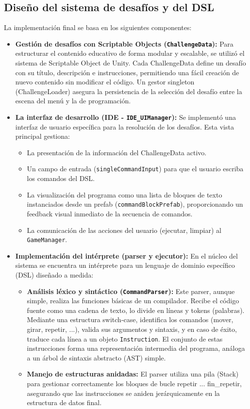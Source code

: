 \subsection{Diseño del sistema de desafíos y del DSL}
La implementación final se basa en los siguientes componentes:
\begin{itemize}
	\item \textbf{Gestión de desafíos con Scriptable Objects (\texttt{ChallengeData}):} Para estructurar el contenido educativo de forma modular y escalable, se utilizó el sistema de Scriptable Object de Unity. Cada ChallengeData define un desafío con su título, descripción e instrucciones, permitiendo una fácil creación de nuevo contenido sin modificar el código. Un gestor singleton (ChallengeLoader) asegura la persistencia de la selección del desafío entre la escena del menú y la de programación.
	
	\item \textbf{La interfaz de desarrollo (IDE - \texttt{IDE\_UIManager}):} Se implementó una interfaz de usuario específica para la resolución de los desafíos. Esta vista principal gestiona:
	\begin{itemize}
		\item La presentación de la información del ChallengeData activo.
		\item Un campo de entrada (\texttt{singleCommandInput}) para que el usuario escriba los comandos del DSL.
		\item La visualización del programa como una lista de bloques de texto instanciados desde un prefab (\texttt{commandBlockPrefab}), proporcionando un feedback visual inmediato de la secuencia de comandos.
		\item La comunicación de las acciones del usuario (ejecutar, limpiar) al \texttt{GameManager}.
	\end{itemize}
	
	\item \textbf{Implementación del intérprete (parser y ejecutor):} En el núcleo del sistema se encuentra un intérprete para un lenguaje de dominio específico (DSL) diseñado a medida:
	\begin{itemize}
		\item \textbf{Análisis léxico y sintáctico (\texttt{CommandParser}):} Este parser, aunque simple, realiza las funciones básicas de un compilador. Recibe el código fuente como una cadena de texto, lo divide en líneas y tokens (palabras). Mediante una estructura switch-case, identifica los comandos (mover, girar, repetir, ...), valida sus argumentos y sintaxis, y en caso de éxito, traduce cada línea a un objeto \texttt{Instruction}. El conjunto de estas instrucciones forma una representación intermedia del programa, análoga a un árbol de sintaxis abstracto (AST) simple.
		\item \textbf{Manejo de estructuras anidadas:} El parser utiliza una pila (Stack) para gestionar correctamente los bloques de bucle repetir ... fin\_repetir, asegurando que las instrucciones se aniden jerárquicamente en la estructura de datos final.
	\end{itemize}
\end{itemize}

